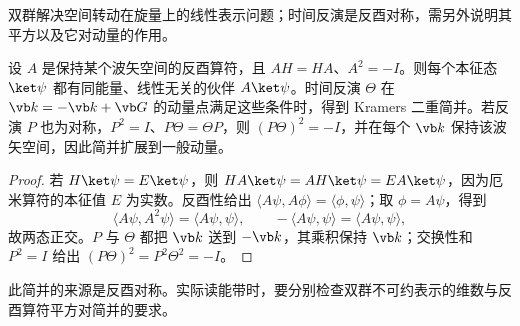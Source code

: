 双群解决空间转动在旋量上的线性表示问题；时间反演是反酉对称，需另外说明其平方以及它对动量的作用。
\begin{theorem}
设 $A$ 是保持某个波矢空间的反酉算符，且 $AH=HA$、$A^2=-I$。则每个本征态 $\ket\psi$ 都有同能量、线性无关的伙伴 $A\ket\psi$。时间反演 $\Theta$ 在 $\vb k=-\vb k+\vb G$ 的动量点满足这些条件时，得到 Kramers 二重简并。若反演 $P$ 也为对称，$P^2=I$、$P\Theta=\Theta P$，则 $(P\Theta)^2=-I$，并在每个 $\vb k$ 保持该波矢空间，因此简并扩展到一般动量。
\end{theorem}
\begin{proof}
若 $H\ket\psi=E\ket\psi$，则 $HA\ket\psi=AH\ket\psi=EA\ket\psi$，因为厄米算符的本征值 $E$ 为实数。反酉性给出 $\langle A\psi,A\phi\rangle=\langle\phi,\psi\rangle$；取 $\phi=A\psi$，得到
\[
\langle A\psi,A^2\psi\rangle=\langle A\psi,\psi\rangle,
\qquad -\langle A\psi,\psi\rangle=\langle A\psi,\psi\rangle,
\]
故两态正交。$P$ 与 $\Theta$ 都把 $\vb k$ 送到 $-\vb k$，其乘积保持 $\vb k$；交换性和 $P^2=I$ 给出 $(P\Theta)^2=P^2\Theta^2=-I$。
\end{proof}
此简并的来源是反酉对称。实际读能带时，要分别检查双群不可约表示的维数与反酉算符平方对简并的要求。
